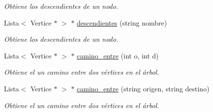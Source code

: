 \begin{DoxyCompactItemize}
\begin{DoxyCompactList}\small\item\em Obtiene los descendientes de un nodo. \end{DoxyCompactList}\item 
Lista$<$ Vertice $\ast$ $>$ $\ast$ \hyperlink{classArbol_a790b07f284b14bd179499eb4a991ad86}{descendientes} (string nombre)
\begin{DoxyCompactList}\small\item\em Obtiene los descendientes de un nodo. \end{DoxyCompactList}\item 
Lista$<$ Vertice $\ast$ $>$ $\ast$ \hyperlink{classArbol_accfa606c5f5e67b6ab18c4490075cf39}{camino\+\_\+entre} (int o, int d)
\begin{DoxyCompactList}\small\item\em Obtiene el un camino entre dos vértices en el árbol. \end{DoxyCompactList}\item 
Lista$<$ Vertice $\ast$ $>$ $\ast$ \hyperlink{classArbol_aef0f680828ac573af495b98d2eb09c12}{camino\+\_\+entre} (string origen, string destino)
\begin{DoxyCompactList}\small\item\em Obtiene el un camino entre dos vértices en el árbol. \end{DoxyCompactList}\end{DoxyCompactItemize}
